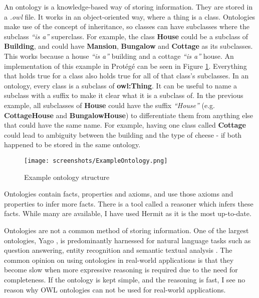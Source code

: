 An ontology is a knowledge-based way of storing information. They are stored in a \textit{.owl} file. It works in an object-oriented way, where a thing is a class. Ontologies make use of the concept of inheritance, so classes can have subclasses where the subclass \textit{``is a''} superclass. For example, the class \textbf{House} could be a subclass of \textbf{Building}, and could have \textbf{Mansion}, \textbf{Bungalow} and \textbf{Cottage} as its subclasses. This works because a house \textit{``is a''} building and a cottage \textit{``is a''} house. An implementation of this example in Protégé can be seen in Figure \ref{fig:example_ontology}. Everything that holds true for a class also holds true for all of that class's subclasses. In an ontology, every class is a subclass of \textbf{owl:Thing}. It can be useful to name a subclass with a suffix to make it clear what it is a subclass of. In the previous example, all subclasses of \textbf{House} could have the suffix \textit{``House''} (e.g. \textbf{CottageHouse} and \textbf{BungalowHouse}) to differentiate them from anything else that could have the same name. For example, having one class called \textbf{Cottage} could lead to ambiguity between the building and the type of cheese - if both happened to be stored in the same ontology. 

\begin{figure}[h]
    \centering
    \captionsetup{justification=centering}
    \texttt{[image: screenshots/ExampleOntology.png]}
    \caption{Example ontology structure}
    \label{fig:example_ontology}
\end{figure}

Ontologies contain facts, properties and axioms, and use those axioms and properties to infer more facts. There is a tool called a reasoner which infers these facts. While many are available, I have used Hermit \cite{hermit} as it is the most up-to-date.

Ontologies are not a common method of storing information. One of the largest ontologies, Yago \cite{suchanek_abiteboul_manolescu_rigaux_rousset_senellart_2011} , is predominantly harnessed for natural language tasks such as question answering, entity recognition and semantic textual analysis \cite{pellissier2020yago}. The common opinion on using ontologies in real-world applications is that they become slow when more expressive reasoning is required \cite{srinivas2009owl, weithoner2007real} due to the need for completeness. If the ontology is kept simple, and the reasoning is fast, I see no reason why OWL ontologies can not be used for real-world applications.

